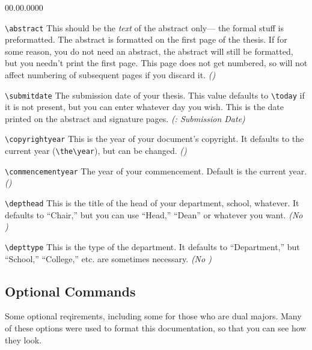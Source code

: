 \begin{lyxlist}{00.00.0000}
\item [\texttt{\textbackslash{}abstract}]This should be the \emph{text}
of the abstract only--- the formal stuff is preformatted. The abstract
is formatted on the first page of the thesis. If for some reason,
you do not need an abstract, the abstract will still be formatted,
but you needn't print the first page. This page does not get numbered,
so will not affect numbering of subsequent pages if you discard it.
\emph{(\LyX{})}
\item [\texttt{\textbackslash{}submitdate}]The submission date of your
thesis. This value defaults to \texttt{\textbackslash{}today} if it
is not present, but you can enter whatever day you wish. This is the
date printed on the abstract and signature pages. \emph{(\LyX{}: Submission
Date)}
\item [\texttt{\textbackslash{}copyrightyear}]This is the year of your
document's copyright. It defaults to the current year (\texttt{\textbackslash{}the\textbackslash{}year}),
but can be changed. \emph{(\LyX{})}
\item [\texttt{\textbackslash{}commencementyear}]The year of your commencement.
Default is the current year. \emph{(\LyX{})}
\item [\texttt{\textbackslash{}depthead}]This is the title of the head
of your department, school, whatever. It defaults to {}``Chair,''
but you can use {}``Head,'' {}``Dean'' or whatever you want. \emph{(No
\LyX{})}
\item [\texttt{\textbackslash{}depttype}]This is the type of the department.
It defaults to {}``Department,'' but {}``School,'' {}``College,''
etc. are sometimes necessary. \emph{(No \LyX{})}
\end{lyxlist}

\subsection{Optional Commands\label{sub:Optional-Commands}}

Some optional reqirements, including some for those who are dual majors.
Many of these options were used to format this documentation, so that
you can see how they look.

